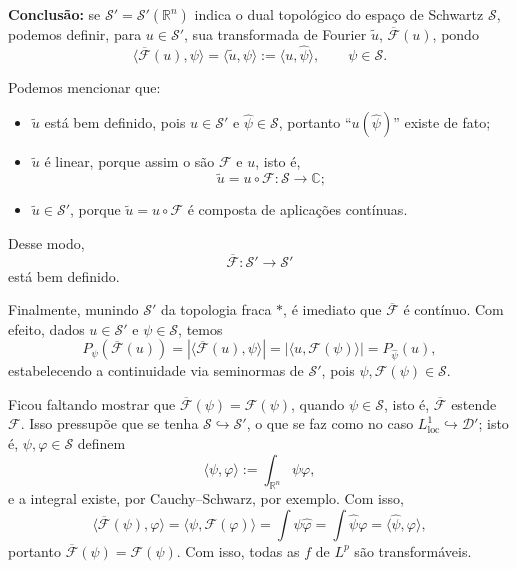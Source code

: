 \documentclass[../distribution_theory_notes.tex]{subfiles}
\begin{document}
\textbf{Conclusão:} se \(\mathcal{S}'=\mathcal{S}'(\mathbb{R}^{n})\) indica o dual topológico do espaço de Schwartz \(\mathcal{S}\), podemos definir, para \(u\in \mathcal{S}'\), sua transformada de Fourier \(\widetilde{u}\), \(\overline{\mathcal{F}}(u)\), pondo
\[
	\langle \overline{\mathcal{F}}(u),\psi \rangle
	=\langle \widetilde{u},\psi \rangle
	:=\langle u,\hat{\psi }\rangle ,
	\qquad \psi \in \mathcal{S}.
\]

Podemos mencionar que:
\begin{itemize}
	\item[(i)] \(\widetilde{u}\) está bem definido, pois \(u\in \mathcal{S}'\) e \(\hat{\psi }\in \mathcal{S}\), portanto ``\(u(\hat{\psi })\)'' existe de fato;
	\item[(ii)] \(\widetilde{u}\) é linear, porque assim o são \(\mathcal{F}\) e \(u\), isto é,
	      \[
		      \widetilde{u}=u\circ \mathcal{F}:\mathcal{S}\longrightarrow \mathbb{C};
	      \]
	\item[(iii)] \(\widetilde{u}\in \mathcal{S}'\), porque \(\widetilde{u}=u\circ \mathcal{F}\) é composta de aplicações contínuas.
\end{itemize}
Desse modo,
\[
	\overline{\mathcal{F}}:\mathcal{S}'\longrightarrow \mathcal{S}'
\]
está bem definido.

Finalmente, munindo \(\mathcal{S}'\) da topologia fraca \(*\), é imediato que \(\overline{\mathcal{F}}\) é contínuo. Com efeito, dados \(u\in \mathcal{S}'\) e \(\psi \in \mathcal{S}\), temos
\[
	P_{\psi }(\overline{\mathcal{F}}(u))
	=|\langle \overline{\mathcal{F}}(u),\psi \rangle|
	=|\langle u,\mathcal{F}(\psi )\rangle|
	=P_{\hat{\psi }}(u),
\]
estabelecendo a continuidade via seminormas de \(\mathcal{S}'\), pois \(\psi ,\mathcal{F}(\psi )\in \mathcal{S}\).

Ficou faltando mostrar que \(\overline{\mathcal{F}}(\psi )=\mathcal{F}(\psi )\), quando \(\psi \in \mathcal{S}\), isto é, \(\overline{\mathcal{F}}\) estende \(\mathcal{F}\). Isso pressupõe que se tenha \(\mathcal{S}\hookrightarrow \mathcal{S}'\), o que se faz como no caso \(L_{\mathrm{loc}}^{1}\hookrightarrow \mathcal{D}'\); isto é, \(\psi ,\varphi \in \mathcal{S}\) definem
\[
	\langle \psi ,\varphi \rangle :=\int_{\mathbb{R}^{n}}\psi \varphi ,
\]
e a integral existe, por Cauchy--Schwarz, por exemplo. Com isso,
\[
	\langle \overline{\mathcal{F}}(\psi ),\varphi \rangle
	=\langle \psi ,\mathcal{F}(\varphi )\rangle
	=\int \psi \hat{\varphi }
	=\int \hat{\psi }\varphi
	=\langle \hat{\psi },\varphi \rangle,
\]
portanto \(\overline{\mathcal{F}}(\psi )=\mathcal{F}(\psi )\).
Com isso, todas as \(f\) de \(L^{p}\) são transformáveis.
\end{document}
